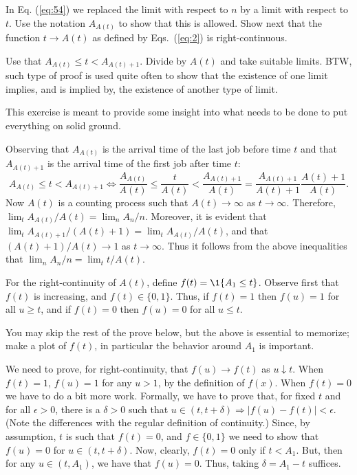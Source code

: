 \begin{exercise}[\faRocket]
   In  Eq. (\ref{eq:54}) we replaced the limit with respect to $n$ by a
    limit with respect to $t$.  Use
    the notation $A_{A(t)}$ to show that  this is allowed.
  Show next that the function $t\to A(t)$ as defined by Eqs.~(\ref{eq:2})
  is right-continuous. 
    \begin{hint}
 Use that $A_{A(t)} \leq t < A_{A(t)+1}$. Divide by $A(t)$
      and take suitable limits. BTW, such type of proof is used quite
      often to show that the existence of one limit implies, and is
      implied by, the existence of another type of limit.  
    \end{hint}
 \begin{solution}
This exercise is meant to provide some insight into what needs
to be done to put everything on solid ground.


 Observing that $A_{A(t)}$ is the arrival time of the last job
    before time $t$ and that $A_{A(t)+1}$ is the arrival time of the
    first job after time $t$: 
  \begin{equation*}
    A_{A(t)}  \leq t  < A_{A(t)+1} \Leftrightarrow 
    \frac{A_{A(t)}} {A(t)}  \leq \frac{t}{A(t)}  <\frac{A_{A(t)+1}}{A(t)} = \frac{A_{A(t)+1}}{A(t)+1}\frac{A(t)+1}{A(t)}.
  \end{equation*}
  Now $A(t)$ is a counting process such that $A(t)\to\infty$ as
  $t\to\infty$. Therefore, $\lim_t A_{A(t)}/A(t) = \lim_n
  A_n/n$.
  Moreover, it is evident that
  $\lim_t A_{A(t)+1}/(A(t)+1) = \lim_t A_{A(t)}/A(t)$, and that
  $(A(t)+1)/A(t)\to 1$ as $t\to\infty$. Thus it follows from the above
  inequalities that $\lim_n A_n/n = \lim_t t/A(t)$.
     



  For the right-continuity of $A(t)$, define $f(t) = \1{A_1 \leq t}$.
  Observe first that $f(t)$ is increasing, and $f(t)\in\{0,1\}$.
  Thus, if $f(t)=1$ then $f(u)=1$ for all $u\geq t$, and if $f(t)=0$ then $f(u) = 0$ for all $u\leq t$.

    You may skip the rest of the prove below, but the above is
    essential to memorize; make a plot of $f(t)$, in particular the
    behavior around $A_1$ is important.

    We need to prove, for right-continuity, that $f(u)\to f(t) $ as
    $u\downarrow t$. When $f(t)=1$, $f(u)=1$ for any $u>1$, by the
    definition of $f(x)$. When $f(t)=0$ we have to do a bit more
    work. Formally, we have to prove that, for fixed $t$ and for all
    $\epsilon > 0$, there is a $\delta>0$ such that
    $u\in(t, t+\delta) \Rightarrow |f(u) -f(t)| < \epsilon$. (Note the
    differences with the regular definition of continuity.) Since, by
    assumption, $t$ is such that $f(t)=0$, and $f\in\{0,1\}$ we need
    to show that $f(u)=0$ for $u\in(t, t+\delta)$. Now, clearly, 
    $f(t)=0$ only if $t < A_1$.  But, then for any $u\in(t, A_1)$, we
    have that $f(u) = 0$. Thus, taking $\delta = A_1 - t$ suffices.


\end{solution}
\end{exercise}
